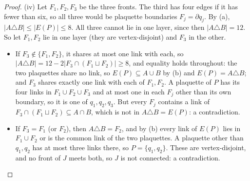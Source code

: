 \documentclass[11pt,a4paper]{article}
\theoremstyle{definition}
\theoremstyle{remark}
\begin{document}
\begin{proof}
(iv) Let $F_1,F_2,F_3$ be the three fronts. The third has four edges if it has fewer than six, so all three would be plaquette boundaries $F_j=\partial q_j$.
By (a), $|A\triangle B|\le|E(P)|\le8$. All three cannot lie in one layer, since then $|A\triangle B|=12$. So let $F_1,F_2$ lie in one layer (they are vertex-disjoint) and
$F_3$ in the other.
\begin{itemize}
\item If $F_3\notin\{F_1,F_2\}$, it shares at most one link with each, so $|A\triangle B|=12-2|F_3\cap(F_1\sqcup F_2)|\ge8$, and equality holds throughout: the two
plaquettes share no link, so $E(P)\subseteq A\cup B$ by (b) and $E(P)=A\triangle B$; and $F_3$ shares exactly one link with each of $F_1,F_2$. A plaquette of $P$ has its
four links in $F_1\cup F_2\cup F_3$ and at most one in each $F_j$ other than its own boundary, so it is one of $q_1,q_2,q_3$. But every $F_j$ contains a link of
$F_3\cap(F_1\sqcup F_2)\subseteq A\cap B$, which is not in $A\triangle B=E(P)$: a contradiction.
\item If $F_3=F_1$ (or $F_2$), then $A\triangle B=F_2$, and by (b) every link of $E(P)$ lies in $F_1\cup F_2$ or is the common link of the two plaquettes. A plaquette other than
$q_1,q_2$ has at most three links there, so $P=\{q_1,q_2\}$. These are vertex-disjoint, and no front of $J$ meets both, so $J$ is not connected: a
contradiction.\qedhere
\end{itemize}
\end{proof}
\end{document}
